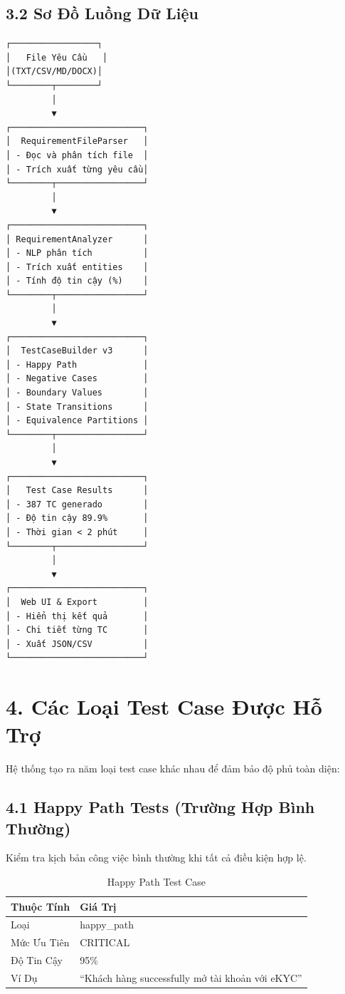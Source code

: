 \documentclass[14pt,a4paper]{article}
\begin{document}
\subsection{3.2 Sơ Đồ Luồng Dữ Liệu}

\begin{verbatim}
┌─────────────────┐
│   File Yêu Cầu   │
│(TXT/CSV/MD/DOCX)│
└────────┬────────┘
         │
         ▼
┌──────────────────────────┐
│  RequirementFileParser   │
│ - Đọc và phân tích file  │
│ - Trích xuất từng yêu cầu│
└────────┬─────────────────┘
         │
         ▼
┌──────────────────────────┐
│ RequirementAnalyzer      │
│ - NLP phân tích          │
│ - Trích xuất entities    │
│ - Tính độ tin cậy (%)    │
└────────┬─────────────────┘
         │
         ▼
┌──────────────────────────┐
│  TestCaseBuilder v3      │
│ - Happy Path             │
│ - Negative Cases         │
│ - Boundary Values        │
│ - State Transitions      │
│ - Equivalence Partitions │
└────────┬─────────────────┘
         │
         ▼
┌──────────────────────────┐
│   Test Case Results      │
│ - 387 TC generado        │
│ - Độ tin cậy 89.9%       │
│ - Thời gian < 2 phút     │
└────────┬─────────────────┘
         │
         ▼
┌──────────────────────────┐
│  Web UI & Export         │
│ - Hiển thị kết quả       │
│ - Chi tiết từng TC       │
│ - Xuất JSON/CSV          │
└──────────────────────────┘
\end{verbatim}

\section{4. Các Loại Test Case Được Hỗ Trợ}

Hệ thống tạo ra năm loại test case khác nhau để đảm bảo độ phủ toàn diện:

\subsection{4.1 Happy Path Tests (Trường Hợp Bình Thường)}
Kiểm tra kịch bản công việc bình thường khi tất cả điều kiện hợp lệ.

\begin{table}[h]
\centering
\begin{tabular}{|l|l|}
\hline
\textbf{Thuộc Tính} & \textbf{Giá Trị} \\
\hline
Loại & happy\_path \\
\hline
Mức Ưu Tiên & CRITICAL \\
\hline
Độ Tin Cậy & 95\% \\
\hline
Ví Dụ & ``Khách hàng successfully mở tài khoản với eKYC'' \\
\hline
\end{tabular}
\caption{Happy Path Test Case}
\end{table}
\end{document}
